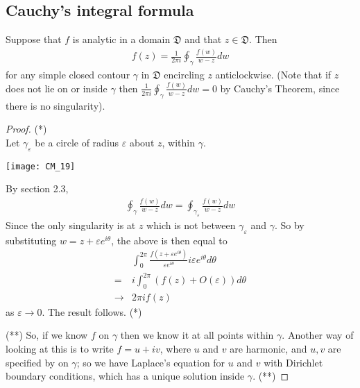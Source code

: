 \documentclass[a4paper]{article}
\begin{document}
\subsection{Cauchy's integral formula}
Suppose that $f$ is analytic in a domain $\mathfrak{D}$ and that $z \in \mathfrak{D}$. Then
\begin{equation*} \tag{*}
\begin{aligned}
f(z) = \frac{1}{2\pi i} \oint_\gamma \frac{f(w)}{w-z} dw
\end{aligned}
\end{equation*}
for any simple closed contour $\gamma$ in $\mathfrak{D}$ encircling $z$ anticlockwise. (Note that if $z$ does not lie on or inside $\gamma$ then $\frac{1}{2\pi i} \oint_\gamma \frac{f(w)}{w-z} dw = 0$ by Cauchy's Theorem, since there is no singularity).
\begin{proof} (*)\\
Let $\gamma_\varepsilon$ be a circle of radius $\varepsilon$ about $z$, within $\gamma$.

\texttt{[image: CM\_19]}

By section 2.3, 
\begin{equation*}
\begin{aligned}
\oint_\gamma \frac{f(w)}{w-z} dw = \oint_{\gamma_\varepsilon} \frac{f(w)}{w-z} dw
\end{aligned}
\end{equation*}
Since the only singularity is at $z$ which is not between $\gamma_\varepsilon$ and $\gamma$. So by substituting $w=z+\varepsilon e^{i\theta}$, the above is then equal to
\begin{equation*}
\begin{aligned}
&\int_0^{2\pi} \frac{f(z+\varepsilon e^{i\theta})}{\varepsilon e^{i\theta}} i\varepsilon e^{i\theta} d\theta\\
= &i \int_0^{2\pi} (f(z)+O(\varepsilon))d\theta\\
\to &2\pi i f(z)
\end{aligned}
\end{equation*}
as $\varepsilon \to 0$. The result follows. (*)

(**) So, if we know $f$ on $\gamma$ then we know it at all points within $\gamma$. Another way of looking at this is to write $f=u+iv$, where $u$ and $v$ are harmonic, and $u,v$ are specified by on $\gamma$; so we have Laplace's equation for $u$ and $v$ with Dirichlet boundary conditions, which has a unique solution inside $\gamma$. (**)


\end{proof}
\end{document}
